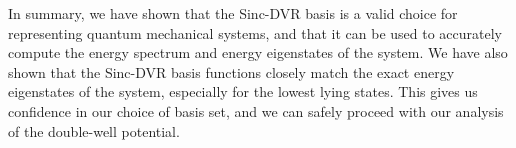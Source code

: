 \documentclass{subfiles}
\begin{document}
In summary, we have shown that the Sinc-DVR basis is a valid choice for representing quantum mechanical systems, and that it can be used to accurately compute the energy spectrum and energy eigenstates of the system. We have also shown that the Sinc-DVR basis functions closely match the exact energy eigenstates of the system, especially for the lowest lying states. This gives us confidence in our choice of basis set, and we can safely proceed with our analysis of the double-well potential.
\end{document}
